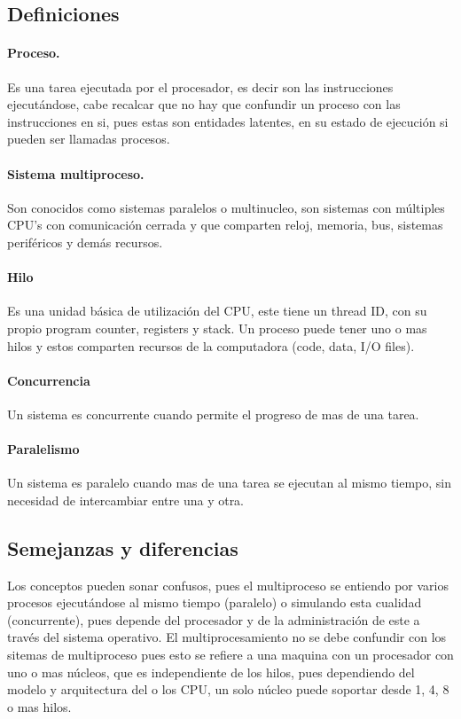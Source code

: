 \documentclass[spanish,12pt,letterpapper]{article}
\begin{document}
	\subsection{Definiciones}
	\paragraph{Proceso.} Es una tarea ejecutada por el procesador, es decir son las instrucciones ejecutándose, cabe recalcar que no hay que confundir un proceso con las instrucciones en si, pues estas son entidades latentes, en su estado de ejecución si pueden ser llamadas procesos.
	
	\paragraph{Sistema multiproceso.} Son conocidos como sistemas paralelos o multinucleo, son sistemas con múltiples CPU's con comunicación cerrada y que comparten reloj, memoria, bus, sistemas periféricos y demás recursos. 
	
	\paragraph{Hilo}
	Es una unidad básica de utilización del CPU, este tiene un thread ID, con su propio program counter, registers y stack. Un proceso puede tener uno o mas hilos y estos comparten recursos de la computadora (code, data, I/O files).
	
	\paragraph{Concurrencia}
	Un sistema es concurrente cuando permite el progreso de mas de una tarea.
	
	\paragraph{Paralelismo}
	Un sistema es paralelo cuando mas de una tarea se ejecutan al mismo tiempo, sin necesidad de intercambiar entre una y otra.
	
	\subsection{Semejanzas y diferencias}
	Los conceptos pueden sonar confusos, pues el multiproceso se entiendo por varios procesos ejecutándose al mismo tiempo (paralelo) o simulando esta cualidad (concurrente), pues depende del procesador y de la administración de este a través del sistema operativo. El multiprocesamiento no se debe confundir con los sitemas de multiproceso pues esto se refiere a una maquina con un procesador con uno o mas núcleos, que es independiente de los hilos, pues dependiendo del modelo y arquitectura del o los CPU, un solo núcleo puede soportar desde 1, 4, 8 o mas hilos.
	
\end{document}
